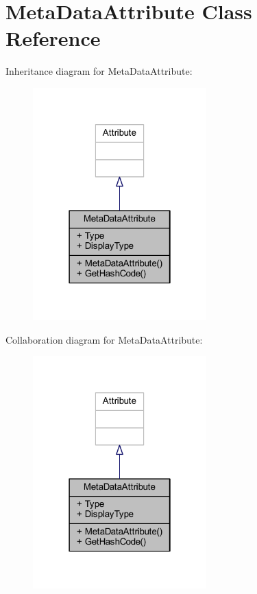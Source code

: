 \hypertarget{class_meta_data_attribute}{}\section{Meta\+Data\+Attribute Class Reference}
\label{class_meta_data_attribute}


Inheritance diagram for Meta\+Data\+Attribute\+:
\nopagebreak
\begin{figure}[H]
\begin{center}
\leavevmode
\includegraphics[width=190pt]{class_meta_data_attribute__inherit__graph}
\end{center}
\end{figure}


Collaboration diagram for Meta\+Data\+Attribute\+:
\nopagebreak
\begin{figure}[H]
\begin{center}
\leavevmode
\includegraphics[width=190pt]{class_meta_data_attribute__coll__graph}
\end{center}
\end{figure}
